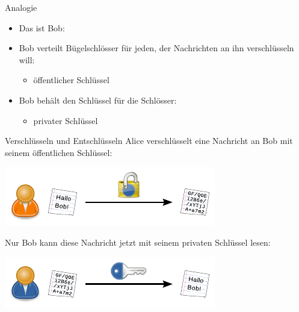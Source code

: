 \documentclass{beamer}
\begin{document}
\begin{frame}{Analogie}
\begin{itemize}
	\item Das ist Bob: 
	\vspace{0.5\baselineskip}

	\item Bob verteilt Bügelschlösser für jeden, der Nachrichten an ihn
		verschlüsseln will:
	\begin{itemize}
		\item öffentlicher Schlüssel
	\end{itemize}
	\vspace{0.5\baselineskip}

	\item Bob behält den Schlüssel für die Schlösser:
	\begin{itemize}
		\item privater Schlüssel
	\end{itemize}
\end{itemize}
\end{frame}

\begin{frame}{Verschlüsseln und Entschlüsseln}
Alice verschlüsselt eine Nachricht an Bob mit seinem öffentlichen Schlüssel: \\
\begin{center}
	\includegraphics[width=.7\textwidth]{public-key-encryption.pdf}
\end{center}

Nur Bob kann diese Nachricht jetzt mit seinem privaten Schlüssel lesen:
\begin{center}
	\includegraphics[width=.7\textwidth]{public-key-decryption.pdf}
\end{center}
\end{frame}
\end{document}
